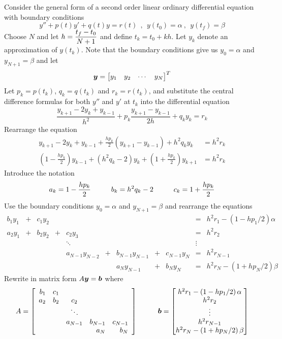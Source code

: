 \begin{example}
Consider the general form of a second order linear ordinary differential equation with boundary conditions
$$
y'' + p(t)y' + q(t)y = r(t) \ \ , \ \ y(t_0) = \alpha \ , \ \ y(t_f) = \beta
$$
Choose $N$ and let  $\displaystyle h = \frac{t_f - t_0}{N+1}$ and define $t_k = t_0 + kh$. Let $y_k$ denote an approximation of $y(t_k)$. Note that the boundary conditions give us $y_0 = \alpha$ and $y_{N+1} = \beta$ and let
$$
\boldsymbol{y} = \begin{bmatrix} y_1 & y_2 & \cdots & y_N \end{bmatrix}^T
$$
Let $p_k = p(t_k)$, $q_k = q(t_k)$ and $r_k = r(t_k)$, and substitute the central difference formulas for both $y''$ and $y'$ at $t_k$ into the differential equation
$$
\frac{y_{k+1} -2y_k + y_{k-1}}{h^2} + p_k \frac{y_{k+1} - y_{k-1}}{2h} + q_k y_k = r_k
$$
Rearrange the equation
\begin{align*}
y_{k+1} -2y_k + y_{k-1} + \frac{h p_k}{2} \left( y_{k+1} - y_{k-1} \right) + h^2q_k y_k &= h^2 r_k \\
\left( 1 - \frac{h p_k}{2} \right) y_{k-1} + (h^2q_k - 2)y_k + \left(1 + \frac{h p_k}{2} \right)y_{k+1} &= h^2 r_k
\end{align*}
Introduce the notation
$$
a_k = 1 - \frac{h p_k}{2}
\hspace{10mm}
b_k = h^2q_k - 2
\hspace{10mm}
c_k = 1 + \frac{h p_k}{2}
$$
Use the boundary conditions $y_0 = \alpha$ and $y_{N+1} = \beta$ and rearrange the equations
$$
\begin{array}{rrrrcrrrrcc}
b_1 y_1 & + & c_1 y_2 & & & & & & & = & h^2 r_1 - \left( 1 - h p_1/2 \right) \alpha \\
a_2 y_1 & + & b_2 y_2 & + & c_2 y_3 & & & & & = & h^2 r_2 \\
& & & & \ddots & & & & & \vdots & \\
& & & & a_{N-1}y_{N-2} & + & b_{N-1}y_{N-1} & + & c_{N-1}y_N & = & h^2 r_{N-1} \\
& & & & & & a_Ny_{N-1} & + & b_Ny_N & = & h^2 r_N - \left( 1 + h p_N/2 \right) \beta
\end{array}
$$
Rewrite in matrix form $A \boldsymbol{y} = \boldsymbol{b}$ where
$$
A =
\left[ \begin{array}{rrcrr}
b_1 & c_1 & & & \\
a_2 & b_2 & c_2 & & \\
& & \ddots & & \\
& & a_{N-1} & b_{N-1} & c_{N-1} \\
& & & a_N & b_N
\end{array} \right]
\hspace{10mm}
\bs{b} = 
\begin{bmatrix}
h^2 r_1 - \left( 1 - h p_1/2 \right) \alpha \\ h^2 r_2 \\ \vdots \\ h^2 r_{N-1} \\ h^2 r_N - \left( 1 + h p_N/2 \right) \beta
\end{bmatrix}
$$
\end{example}

